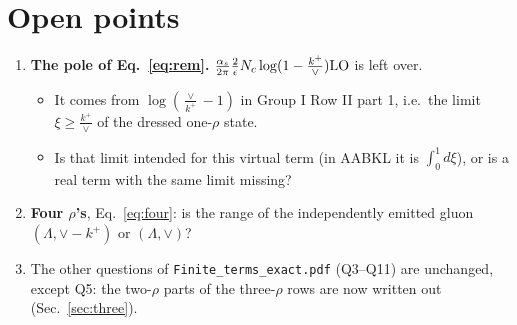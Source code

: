 \documentclass[10pt]{article}
\numberwithin{equation}{section}
\begin{document}
\section{Open points}\label{sec:open}
\begin{enumerate}
\item[\textbf{Q1}] \textbf{The pole of Eq.~\eqref{eq:rem}.} $\frac{\alpha_s}{2\pi}\frac2\epsilon N_c\log(1-\frac{k^+}{\vee}){\rm LO}$ is left over.
\begin{itemize}
\item It comes from $\log(\frac{\vee}{k^+}-1)$ in Group I Row II part 1, i.e.\ the limit $\xi\ge\frac{k^+}{\vee}$ of the dressed one-$\rho$ state.
\item Is that limit intended for this virtual term (in AABKL it is $\int_0^1d\xi$), or is a real term with the same limit missing?
\end{itemize}
\item[\textbf{Q2}] \textbf{Four $\rho$'s}, Eq.~\eqref{eq:four}: is the range of the independently emitted gluon $(\Lambda,\vee-k^+)$ or $(\Lambda,\vee)$?
\item[\textbf{Q3--Q11}] The other questions of \texttt{Finite\_terms\_exact.pdf} (Q3--Q11) are unchanged, except Q5: the two-$\rho$ parts of the three-$\rho$ rows are now written out (Sec.~\ref{sec:three}).
\end{enumerate}

\end{document}
